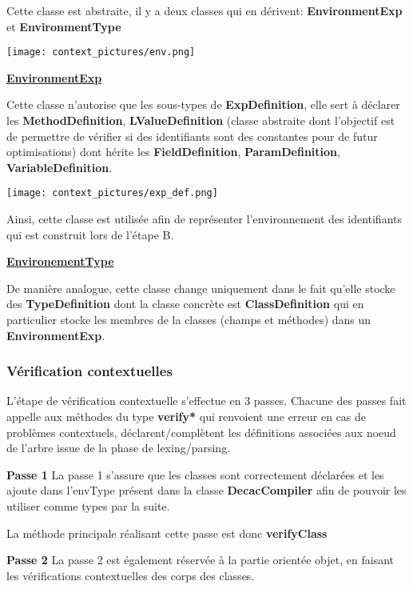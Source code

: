 \documentclass[12pt, a4paper, one side]{article}
\begin{document}
    Cette classe est abstraite, il y a deux classes qui en dérivent: \textbf{EnvironmentExp} et \textbf{EnvironmentType}

    \texttt{[image: context\_pictures/env.png]}

    \textbf{\underline{EnvironmentExp}}

    Cette classe n'autorise que les sous-types de \textbf{ExpDefinition}, elle sert à déclarer les \textbf{MethodDefinition}, \textbf{LValueDefinition}
    (classe abstraite dont l'objectif est de permettre de vérifier si des identifiants sont des constantes pour de futur optimisations)
    dont hérite les \textbf{FieldDefinition}, \textbf{ParamDefinition}, \textbf{VariableDefinition}.

    \texttt{[image: context\_pictures/exp\_def.png]}

    Ainsi, cette classe est utilisée afin de représenter l'environnement des identifiants qui est construit lors de l'étape B.

    \textbf{\underline{EnvironementType}}

    De manière analogue, cette classe change uniquement dans le fait qu'elle stocke des \textbf{TypeDefinition} dont
    la classe concrète est \textbf{ClassDefinition} qui en particulier stocke les membres de la classes (champs et méthodes) dans un \textbf{EnvironmentExp}.

    \subsubsection{Vérification contextuelles}

    L'étape de vérification contextuelle s'effectue en 3 passes.
    Chacune des passes fait appelle aux méthodes du type \textbf{verify*}
    qui renvoient une erreur en cas de problèmes contextuels, déclarent/complètent les définitions associées aux noeud de l'arbre issue de la phase de lexing/parsing.

    \textbf{Passe 1}
    La passe 1 s'assure que les classes sont correctement déclarées et les ajoute dans l'envType présent dans la classe \textbf{DecacCompiler} afin
    de pouvoir les utiliser comme types par la suite.

    La méthode principale réalisant cette passe est donc \textbf{verifyClass}

    \textbf{Passe 2}
    La passe 2 est également réservée à la partie orientée objet, en faisant les vérifications contextuelles des corps des classes.
\end{document}
